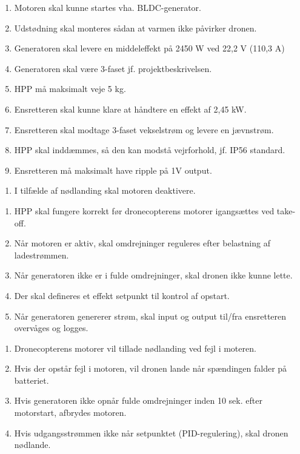 \begin{enumerate}
\item Motoren skal kunne startes vha. BLDC-generator.
\item Udstødning skal monteres sådan at varmen ikke påvirker dronen.
\item Generatoren skal levere en middeleffekt på 2450 W ved 22,2 V (110,3 A)
\item Generatoren skal være 3-faset jf. projektbeskrivelsen.
\item HPP må maksimalt veje 5 kg.
\item Ensretteren skal kunne klare at håndtere en effekt af 2,45 kW.
\item Ensretteren skal modtage 3-faset vekselstrøm og levere en jævnstrøm.
\item HPP skal inddæmmes, så den kan modstå vejrforhold, jf. IP56 standard.
\item Ensretteren må maksimalt have ripple på 1V output.
\end{enumerate}

\label{sec:kravspecifikation-2}

\begin{enumerate}
\item I tilfælde af nødlanding skal motoren deaktivere. 
\end{enumerate}

\label{sec:kravspecifikation-3}

\begin{enumerate}
\item HPP skal fungere korrekt før dronecopterens motorer igangsættes ved take-off.
\item Når motoren er aktiv, skal omdrejninger reguleres efter belastning af ladestrømmen.
\item Når generatoren ikke er i fulde omdrejninger, skal dronen ikke kunne lette.
\item Der skal defineres et effekt setpunkt til kontrol af opstart.
\item Når generatoren genererer strøm, skal input og output til/fra ensretteren overvåges og logges.
\end{enumerate}

\label{sec:kravspecifikation-4}

\begin{enumerate}
\item Dronecopterens motorer vil tillade nødlanding ved fejl i moteren.
\item Hvis der opstår fejl i motoren, vil dronen lande når spændingen falder på batteriet.
\item Hvis generatoren ikke opnår fulde omdrejninger inden 10 sek. efter motorstart, afbrydes motoren.
\item Hvis udgangsstrømmen ikke når setpunktet (PID-regulering), skal dronen nødlande.
\end{enumerate}

